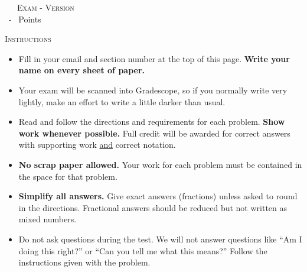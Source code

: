 \begin{center}
  \textsc{\GetTerm \ \GetCourse \ \GetExamUnit \ Exam - Version \GetVersionID {}}\\
  \footnotesize \GetExamLength \ - \pointssum* \ Points
\end{center}

\noindent \textsc{Instructions}
\begin{footnotesize}
\begin{itemize}
\item Fill in your email and section number at the top of this page. \textbf{Write your name on every sheet of paper.}
\item Your exam will be scanned into Gradescope, so if you normally write very lightly, make an effort to write a little darker than usual. %
\item Read and follow the directions and requirements for each problem. \textbf{Show work whenever possible.} Full credit will be awarded for correct answers with supporting work \underline{and} correct notation.
\item \textbf{No scrap paper allowed.} Your work for each problem must be contained in the space for that problem.
\item \textbf{Simplify all answers.} Give exact answers (fractions) unless asked to round in the directions. Fractional answers should be reduced but not written as mixed numbers.
\item Do not ask questions during the test. We will not answer questions like ``Am I doing this right?'' or ``Can you tell me what this means?'' Follow the instructions given with the problem.\\
\end{itemize}
\end{footnotesize}

